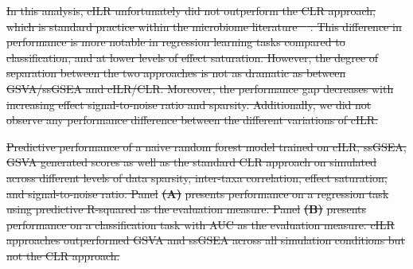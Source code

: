 \documentclass[10pt,letterpaper]{article}
\providecommand{\DIFdeltex}[1]{{\protect\color{red}\sout{#1}}}                      %
\providecommand{\DIFdelbegin}{} %
\providecommand{\DIFdelend}{} %
\providecommand{\DIFdelFL}[1]{\DIFdel{#1}} %
\providecommand{\DIFdel}[1]{\texorpdfstring{\DIFdeltex{#1}}{}} %
\newcommand{\DIFscaledelfig}{0.5}
\newlength{\DIFdelgraphicswidth} %
\newlength{\DIFdelgraphicsheight} %
\newcommand{\DIFdelincludegraphics}[2][]{%
\sbox{\DIFdelgraphicsbox}{\DIFOincludegraphics[#1]{#2}}%
\settoboxwidth{\DIFdelgraphicswidth}{\DIFdelgraphicsbox} %
\settoboxtotalheight{\DIFdelgraphicsheight}{\DIFdelgraphicsbox} %
\scalebox{\DIFscaledelfig}{%
\parbox[b]{\DIFdelgraphicswidth}{\usebox{\DIFdelgraphicsbox}\\[-\baselineskip] \rule{\DIFdelgraphicswidth}{0em}}\llap{\resizebox{\DIFdelgraphicswidth}{\DIFdelgraphicsheight}{%
\setlength{\unitlength}{\DIFdelgraphicswidth}%
\begin{picture}(1,1)%
\thicklines\linethickness{2pt} %
{\color[rgb]{1,0,0}\put(0,0){\framebox(1,1){}}}%
{\color[rgb]{1,0,0}\put(0,0){\line( 1,1){1}}}%
{\color[rgb]{1,0,0}\put(0,1){\line(1,-1){1}}}%
\end{picture}%
}\hspace*{3pt}}} %
} %
\DeclareRobustCommand{\DIFdelbegin}{\DIFOdelbegin \let\includegraphics\DIFdelincludegraphics} %
\DeclareRobustCommand{\DIFdelend}{\DIFOaddend \let\includegraphics\DIFOincludegraphics} %
\begin{document}
\DIFdelbegin \DIFdel{In this analysis, cILR unfortunately did not outperform the CLR approach, which is standard practice within the microbiome literature \mbox{%
\cite{gloor2017}}\hspace{0pt}%
. This difference in performance is more notable in regression learning tasks compared to classification, and at lower levels of effect saturation. However, the degree of separation between the two approaches is not as dramatic as between GSVA/ssGSEA and cILR/CLR. Moreover, the performance gap decreases with increasing effect signal-to-noise ratio and sparsity. Additionally, we did not observe any performance difference between the different variations of cILR. 
}%

{%
\DIFdelFL{Predictive performance of a naive random forest model trained on cILR, ssGSEA, GSVA generated scores as well as the standard CLR approach on simulated across different levels of data sparsity, inter-taxa correlation, effect saturation, and signal-to-noise ratio. Panel }\textbf{\DIFdelFL{(A)}} %
\DIFdelFL{presents performance on a regression task using predictive R-squared as the evaluation measure. Panel }\textbf{\DIFdelFL{(B)}} %
\DIFdelFL{presents performance on a classification task with AUC as the evaluation measure. cILR approaches outperformed GSVA and ssGSEA across all simulation conditions but not the CLR approach.}}

\DIFdelend %
\end{document}
